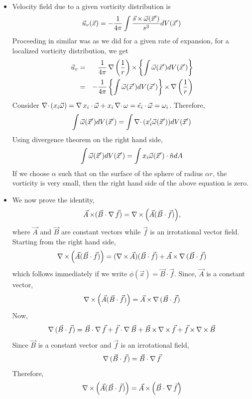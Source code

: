 \begin{itemize}
\item Velocity field due to a given vorticity distribution is
\[
\vec{u}_v(\vec{x}) = -\frac{1}{4\pi}\int\frac{\vec{s}\operatorname{\times}\vec{\omega}(\vec{x}^\prime)}{s^3} dV(\vec{x}^\prime)
\]
Proceeding in similar was as we did for a given rate of expansion, for a localized vorticity distribution, we get
\begin{eqnarray*}
\vec{u}_v &=& \frac{1}{4\pi}\operatorname{\nabla}{\left(\frac{1}{r}\right)}\operatorname{\times}\left\{\int \vec{\omega}(\vec{x}^\prime)dV(\vec{x}^\prime)\right\} \\
 &=& -\frac{1}{4\pi}\left\{\int \vec{\omega}(\vec{x}^\prime)dV(\vec{x}^\prime)\right\} \operatorname{\times} \operatorname{\nabla}{\left(\frac{1}{r}\right)}
\end{eqnarray*}
Consider $\operatorname{\nabla\cdot}{(x_i\vec{\omega})} = \operatorname{\nabla}{x_i}\cdot\vec{\omega} + x_i\operatorname{\nabla\cdot}{\omega} = \hat{e_{i}}\cdot\vec{\omega} = \omega_i$. Therefore,
\[
\int\vec{\omega}(\vec{x}^\prime)dV(\vec{x}^\prime) = \int\operatorname{\nabla\cdot}{(x_i^\prime\vec{\omega}(\vec{x}^\prime))}dV(\vec{x}^\prime)
\]
Using divergence theorem on the right hand side,
\[
\int\vec{\omega}(\vec{x}^\prime)dV(\vec{x}^\prime) = \int x_i\vec{\omega}(\vec{x}^\prime)\cdot\hat{n} dA
\]
If we choose $\alpha$ such that on the surface of the sphere of radius $\alpha r$, the vorticity is very small, then the right hand side of the above equation is zero.

\item We now prove the identity,
\[
\vec{A}\operatorname{\times}(\vec{B}\cdot\operatorname{\nabla}{\vec{f}}) = \operatorname{\nabla\operatorname{\times}}{\left(\vec{A}(\vec{B}\cdot\vec{f})\right)},
\]
where $\vec{A}$ and $\vec{B}$ are constant vectors while $\vec{f}$ is an irrotational vector field. Starting from the right hand side,
\[
\operatorname{\nabla\operatorname{\times}}{\left(\vec{A}(\vec{B}\cdot\vec{f})\right)} = (\operatorname{\nabla\operatorname{\times}}{\vec{A}})(\vec{B}\cdot\vec{f}) + \vec{A}\operatorname{\times}\operatorname{\nabla}{(\vec{B}\cdot\vec{f})} 
\]
which follows immediately if we write $\phi(\vec{x}) = \vec{B}\cdot\vec{f}$. Since, $\vec{A}$ is a constant vector,
\[
\operatorname{\nabla\operatorname{\times}}{\left(\vec{A}(\vec{B}\cdot\vec{f})\right)} = \vec{A}\operatorname{\times}\operatorname{\nabla}{(\vec{B}\cdot\vec{f})} 
\]
Now,
\[
\operatorname{\nabla}{(\vec{B}\cdot\vec{f})} = \vec{B}\cdot\operatorname{\nabla}{\vec{f}} + \vec{f}\cdot\operatorname{\nabla}{\vec{B}} + \vec{B}\operatorname{\times}\operatorname{\nabla\operatorname{\times}}{\vec{f}} + \vec{f}\operatorname{\times}\operatorname{\nabla\operatorname{\times}}{\vec{B}}
\]
Since $\vec{B}$ is a constant vector and $\vec{f}$ is an irrotational field,
\[
\operatorname{\nabla}{(\vec{B}\cdot\vec{f})} = \vec{B}\cdot\operatorname{\nabla}{\vec{f}} 
\]
Therefore,
\begin{equation}\label{c2s9e1}
\operatorname{\nabla\operatorname{\times}}{\left(\vec{A}(\vec{B}\cdot\vec{f})\right)} = \vec{A}\operatorname{\times}\left(\vec{B}\cdot\operatorname{\nabla}{\vec{f}}\right)
\end{equation}


\end{itemize}
